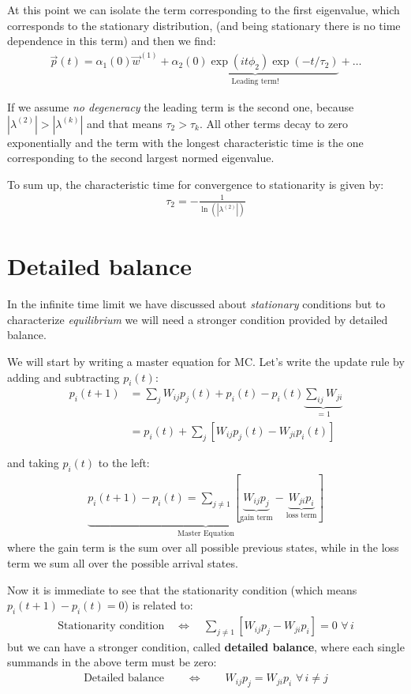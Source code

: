 \documentclass[\main/main.tex]{subfiles}
\begin{document}
At this point we can isolate the term corresponding to the first eigenvalue, which corresponds to the stationary distribution, (and being stationary there is no time dependence in this term) and then we find:
\begin{eqnarray}
    \Vec{p}(t)=\alpha_1(0)\Vec{w}^{(1)}+\underbrace{\alpha_2(0)\exp(it\phi_2)\exp(-t/\tau_2)}_{\text{Leading term!}} +\dots
\end{eqnarray}

If we assume \textit{no degeneracy} the leading term is the second one, because $|\lambda^{(2)}|>|\lambda^{(k)}|$ and that means $\tau_2>\tau_k$. All other terms decay to zero exponentially and the term with the longest characteristic time is the one corresponding to the second largest normed eigenvalue.

To sum up, the characteristic time for convergence to stationarity is given by:
\begin{eqnarray}
  \boxed{  \tau_2=-\frac{1}{\ln{(|\lambda^{(2)}|)}}}
\end{eqnarray}
\section{Detailed balance}

In the infinite time limit we have discussed about \textit{stationary} conditions but to characterize \textit{equilibrium} we will need a stronger condition provided by detailed balance.

We will start by writing a master equation for MC. Let's write the update rule by adding and subtracting $p_i(t)$:
\begin{align}
        p_i(t+1) &=\sum_j W_{ij}p_j(t) +p_i(t)-p_i(t)\underbrace{\sum_{ij}W_{ji}}_{=1} \\
        &=p_i(t) + \sum_j [W_{ij}p_j(t) - W_{ji}p_i(t)]
\end{align}

and taking $p_i(t)$ to the left:
\begin{eqnarray}
   \underbrace{ p_i(t+1)-p_i(t)=\sum_{j\neq 1}[\underbrace{W_{ij}p_j}_{\text{gain term}}-\underbrace{W_{ji}p_i}_{\text{loss term}}]}_{\text{Master Equation}}
\end{eqnarray}
where the gain term is the sum over all possible previous states, while in the loss term we sum all over the possible arrival states.

Now it is immediate to see that the stationarity condition (which means $p_i(t+1)-p_i(t)=0$) is related to:
\begin{eqnarray}
   \text{Stationarity condition}\quad \iff \quad \sum_{j\neq 1}[{W_{ij}p_j}-{W_{ji}p_i}]=0 \,\, \forall \, i
\end{eqnarray}
but we can have a stronger condition, called \textbf{detailed balance}, where each single summands in the above term must be zero:
\begin{eqnarray}
   \text{Detailed balance}\qquad \iff \qquad {W_{ij}p_j}={W_{ji}p_i} \,\, \forall \, i\neq j
   \label{eq:db}
\end{eqnarray}
\end{document}
